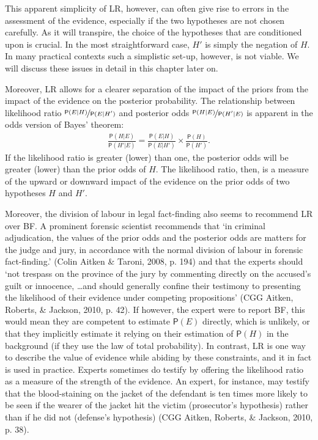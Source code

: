 \documentclass[
  10pt,
  dvipsnames,enabledeprecatedfontcommands]{scrartcl}
\newcommand{\pr}[1]{\mathsf{P}(#1)}
\begin{document}
This apparent simplicity of \textsf{LR}, however, can often give rise to
errors in the assessment of the evidence, especially if the two
hypotheses are not chosen carefully. As it will transpire, the choice of
the hypotheses that are conditioned upon is crucial. In the most
straightforward case, \(H'\) is simply the negation of \(H\). In many
practical contexts such a simplistic set-up, however, is not viable. We
will discuss these issues in detail in this chapter later on.

Moreover, \textsf{LR} allows for a clearer separation of the impact of
the priors from the impact of the evidence on the posterior probability.
The relationship between likelihood ratio
\(\nicefrac{\pr{E \vert H}}{\pr{E \vert H'}}\) and posterior odds
\(\nicefrac{\pr{H \vert E}}{\pr{H' \vert E}}\) is apparent in the odds
version of Bayes' theorem: \begin{align}\label{eq:BTodds}
\frac{\pr{H \vert E}}{\pr{H' \vert E}}= \frac{\pr{E \vert H}}{\pr{E \vert H'}}\times \frac{\pr{H}}{\pr{H'}}.
\end{align} \noindent If the likelihood ratio is greater (lower) than
one, the posterior odds will be greater (lower) than the prior odds of
\(H\). The likelihood ratio, then, is a measure of the upward or
downward impact of the evidence on the prior odds of two hypotheses
\(H\) and \(H'\).

Moreover, the division of labour in legal fact-finding also seems to
recommend \textsf{LR} over \textsf{BF}. A prominent forensic scientist
recommends that `in criminal adjudication, the values of the prior odds
and the posterior odds are matters for the judge and jury, in accordance
with the normal division of labour in forensic fact-finding.' (Colin
Aitken \& Taroni, 2008, p. 194) and that the experts should `not
trespass on the province of the jury by commenting directly on the
accused's guilt or innocence, \dots and should generally confine their
testimony to presenting the likelihood of their evidence under competing
propositions' (CGG Aitken, Roberts, \& Jackson, 2010, p. 42). If
however, the expert were to report \textsf{BF}, this would mean they are
competent to estimate \(\pr{E}\) directly, which is unlikely, or that
they implicitly estimate it relying on their estimation of \(\pr{H}\) in
the background (if they use the law of total probability). In contrast,
\textsf{LR} is one way to describe the value of evidence while abiding
by these constraints, and it in fact is used in practice. Experts
sometimes do testify by offering the likelihood ratio as a measure of
the strength of the evidence. An expert, for instance, may testify that
the blood-staining on the jacket of the defendant is ten times more
likely to be seen if the wearer of the jacket hit the victim
(prosecutor's hypothesis) rather than if he did not (defense's
hypothesis) (CGG Aitken, Roberts, \& Jackson, 2010, p. 38).
\end{document}
